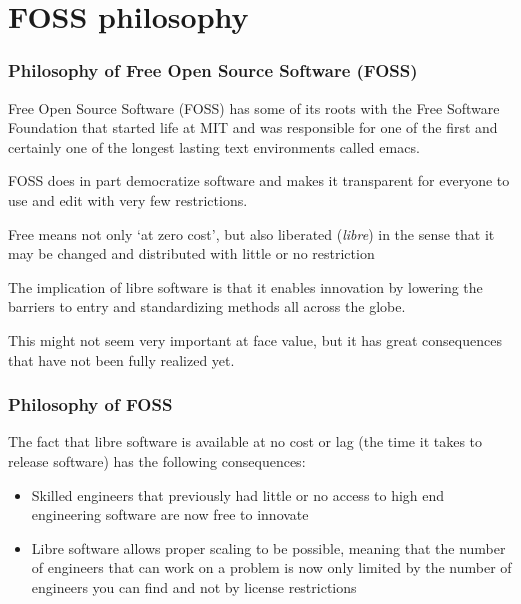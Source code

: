 \documentclass{beamer}
\begin{document}
\section{FOSS philosophy}


\begin{frame}
\frametitle{Philosophy of Free Open Source Software (FOSS)}

Free Open Source Software (FOSS) has some of its roots with the Free Software Foundation that started life at MIT and was responsible for one of the first and certainly one of the longest lasting text environments called emacs.

FOSS does in part democratize software and makes it transparent for everyone to use and edit with very few restrictions.

Free means not only `at zero cost', but also liberated (\emph{libre}) in the sense that it may be changed and distributed with little or no restriction

The implication of libre software is that it enables innovation by lowering the barriers to entry and standardizing methods all across the globe.

This might not seem very important at face value, but it has great consequences that have not been fully realized yet.

\end{frame}


\begin{frame}
\frametitle{Philosophy of FOSS}

The fact that libre software is available at no cost or lag (the time it takes to release software) has the following consequences:

\begin{itemize}
\item Skilled engineers that previously had little or no access to high end engineering software are now free to innovate
\item Libre software allows proper scaling to be possible, meaning that the number of engineers that can work on a problem is now only limited by the number of engineers you can find and not by license restrictions
\end{itemize}

\end{frame}
\end{document}
